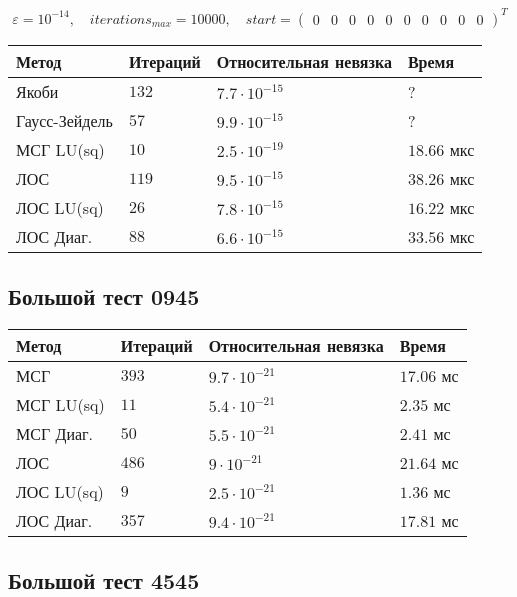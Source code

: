 $$ \varepsilon = 10^{-14}, \quad iterations_{max} = 10000, \quad start = \begin{pmatrix} 0 & 0 & 0 & 0 & 0 & 0 & 0 & 0 & 0 & 0 \end{pmatrix}^T $$

\setlength{\tabcolsep}{2pt}
\tabulinesep=0.3mm
\noindent\begin{tabu}{|X[-1,l]|X[-1,l]|X[-1,l]|X[-1,l]|}
\hline
Метод & Итераций & Относительная невязка & Время \\ \hline
Якоби & $132$ & $7.7\cdot 10^{-15}$ & ? \\ \hline
Гаусс-Зейдель & $57$ & $9.9 \cdot 10^{-15}$ & ? \\ \hline
МСГ LU(sq) & $10$ & $2.5 \cdot 10^{-19}$ & $18.66$ мкс \\ \hline
ЛОС & $119$ & $9.5 \cdot 10^{-15}$ & $38.26$ мкс \\ \hline
{}
ЛОС LU(sq) & $26$ & $7.8 \cdot 10^{-15}$ & $16.22$ мкс \\ \hline
ЛОС Диаг. & $88$ & $6.6 \cdot 10^{-15}$ & $33.56$ мкс \\ \hline
\end{tabu}

\subsection{Большой тест 0945}

\setlength{\tabcolsep}{2pt}
\tabulinesep=0.3mm
\noindent\begin{tabu}{|X[-1,l]|X[-1,l]|X[-1,l]|X[-1,l]|}
\hline
Метод & Итераций & Относительная невязка & Время \\ \hline
МСГ & $393$ & $9.7\cdot 10^{-21}$ & $17.06$ мс \\ \hline
МСГ LU(sq) & $11$ & $5.4 \cdot 10^{-21}$ & $2.35$ мс \\ \hline
МСГ Диаг. & $50$ & $5.5 \cdot 10^{-21}$ & $2.41$ мс \\ \hline
ЛОС & $486$ & $9 \cdot 10^{-21}$ & $21.64$ мс \\ \hline
{}
ЛОС LU(sq) & $9$ & $2.5 \cdot 10^{-21}$ & $1.36$ мс \\ \hline
ЛОС Диаг. & $357$ & $9.4 \cdot 10^{-21}$ & $17.81$ мс \\ \hline
\end{tabu}

\subsection{Большой тест 4545}

